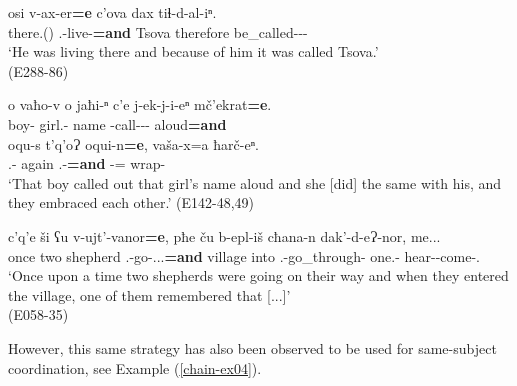 \begin{exe}
	\ex\label{chain-ex03}
	\begin{xlist}
		
		
			\ex\label{chain-ex03a}
			\gll  osi v-ax-er\textbf{=e} c'ova dax tiɬ-d-al-iⁿ. \\
			there.{\Dist}({\Ess}) {\M}.{\Sg}-live-{\Imprf}\textbf{=and} Tsova therefore be\_called-{\D}-{\Intr}-{\Aor} \\
			\trans `He was living there and because of him it was called Tsova.' \\
			\hfill (E288-86)
		
		
		
			\ex\label{chain-ex03b}
			\gll o vaħo-v o jaħi-ⁿ c'e j-ek-j-i-eⁿ mč'ekrat\textbf{=e}. \\
			{\Dist} boy-{\Erg} {\Dist} girl.{\Obl}-{\Gen} name {\J}-call-{\J}-{\Tr}-{\Aor} aloud\textbf{=and} \\
			
			\gll oqu-s t'q'oɁ oqui-n\textbf{=e}, vaša-x=a ħarč-eⁿ. \\
			{\Dist}.{\Obl}-{\Erg} again {\Dist}.{\Obl}-{\Gen}\textbf{=and} {\Recp}-{\Cont}={\Emph} wrap-{\Aor}\\
			\trans `That boy called out that girl's name aloud and she [did] the same with his, and they embraced each other.'
			\hfill (E142-48,49)
		
		
		
		
			\ex\label{chain-ex03c}
			\gll c'q'e ši ʕu v-ujt'-vanor\textbf{=e}, pħe ču b-epl-iš cħana-n dak'-d-eɁ-nor, me...\\
			once two shepherd {\M}.{\Sg}-go-{\M}.{\Sg}.{\Nw}.{\Imprf}\textbf{=and} village into {\M}.{\Pl}-go\_through-{\Simul} one.{\Obl}-{\Dat} hear-{\D}-come-{\Nw}.{\Rem} {\Subord}\\
			\trans `Once upon a time two shepherds were going on their way and when they entered the village, one of them remembered that [...]' \\
			\hfill (E058-35)
		
		
	\end{xlist}
\end{exe}

However, this same strategy has also been observed to be used for same-subject coordination, see Example (\ref{chain-ex04}).\largerpage[2]

